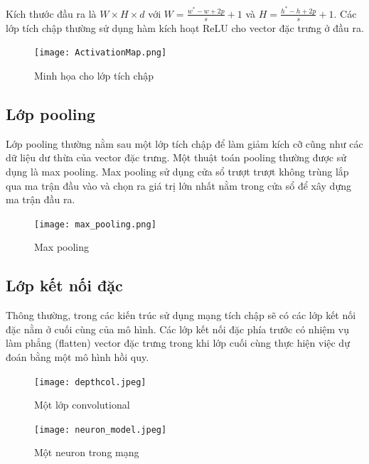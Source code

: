 \documentclass[../thesis.tex]{subfiles}
\begin{document}
Kích thước đầu ra là $W \times H \times d$ với $W = \displaystyle\frac{w^*-w+2p}{s}+1$ và $H = \displaystyle\frac{h^*-h+2p}{s}+1$. Các lớp tích chập thường sử dụng hàm kích hoạt ReLU cho vector đặc trưng ở đầu ra.

\begin{figure}[H]
    \centering
    \texttt{[image: ActivationMap.png]}
    \caption{Minh họa cho lớp tích chập \cite{adeshpande3cnn1}}\label{activation_map}
\end{figure}


\subsection{Lớp pooling} 

Lớp pooling thường nằm sau một lớp tích chập để làm giảm kích cỡ cũng như các dữ liệu dư thừa của vector đặc trưng. Một thuật toán pooling thường được sử dụng là max pooling. Max pooling sử dụng cửa sổ trượt trượt không trùng lắp qua ma trận đầu vào và chọn ra giá trị lớn nhất nằm trong cửa sổ để xây dựng ma trận đầu ra.

\begin{figure}[H]
    \centering
    \texttt{[image: max\_pooling.png]}
    \caption{Max pooling}\label{max_pooling}
\end{figure}

\subsection{Lớp kết nối đặc}

Thông thường, trong các kiến trúc sử dụng mạng tích chập sẽ có các lớp kết nối đặc nằm ở cuối cùng của mô hình. Các lớp kết nối đặc phía trước có nhiệm vụ làm phẳng (flatten) vector đặc trưng trong khi lớp cuối cùng thực hiện việc dự đoán bằng một mô hình hồi quy.

\begin{figure}[H]
    \begin{minipage}{0.48\textwidth}
        \centering
        \texttt{[image: depthcol.jpeg]}
        \caption{Một lớp convolutional}\label{Fig:depthcol}
    \end{minipage}\hfill
    \begin{minipage}{0.48\textwidth}
        \centering
        \texttt{[image: neuron\_model.jpeg]}
        \caption{Một neuron trong mạng}\label{Fig:neural_model}
    \end{minipage}
\end{figure}
\end{document}
